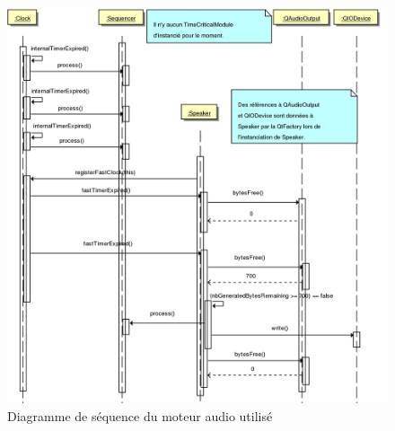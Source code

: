\begin{figure}[htb]
\centering
\includegraphics[width=17cm]{../img/ps/psm_currentAudioEngine_Sequence.pdf}
\caption{Diagramme de séquence du moteur audio utilisé}
\end{figure}



